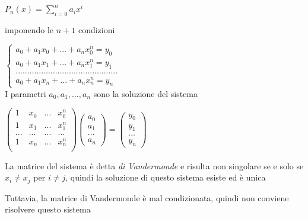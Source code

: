 \documentclass[openany]{book}
\begin{document}
$P_n(x)=\sum_{i=0}^n a_ix^i$

imponendo le $n+1$ condizioni

$\left\{ \begin{array}{l} a_0 + a_1x_0+...+a_nx_0^n=y_0 \\
a_0 + a_1x_1+...+a_nx_1^n=y_1 \\ 
............................................\\
a_0 + a_1x_n+...+a_nx_n^n=y_n \end{array}\right.$
\\

I parametri $a_0,a_1,...,a_n$ sono la soluzione del sistema 

$\left( \begin{array}{llll} 1 & x_0 & ... & x_0^n \\
1 & x_1 & ... & x_1^n \\
... & ... & ... & ... \\
1 & x_n & ... & x_n^n \\ \end{array}\right)
\left( \begin{array}{l} a_0 \\ a_1 \\ ... \\ a_n \end{array}\right) =
\left( \begin{array}{l} y_0 \\ y_1 \\ ... \\ y_n \end{array}\right)
$

La matrice del sistema è detta \textit{di Vandermonde} e risulta non singolare se e solo se $x_i\neq x_j$ 
per $i\neq j$, quindi la soluzione di questo sistema esiste ed è unica

Tuttavia, la matrice di Vandermonde è mal condizionata, quindi non conviene risolvere questo sistema 
\end{document}
